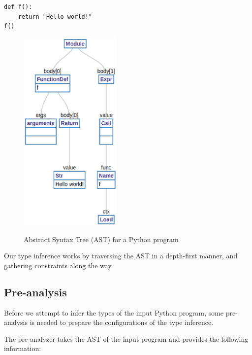 \begin{lstlisting}
def f():
	return "Hello world!"
f()
\end{lstlisting}
\begin{figure}
	\begin{mdframed}
		\centering
		\includegraphics[width=50mm]{images/ast.eps}\\
	\end{mdframed}
	\caption{Abstract Syntax Tree (AST) for a Python program}
	\label{fig:ast}
\end{figure}

Our type inference works by traversing the AST in a depth-first manner, and gathering constraints along the way.
\subsection{Pre-analysis}\label{pre}
Before we attempt to infer the types of the input Python program, some pre-analysis is needed to prepare the configurations of the type inference.

The pre-analyzer takes the AST of the input program and provides the following information:

